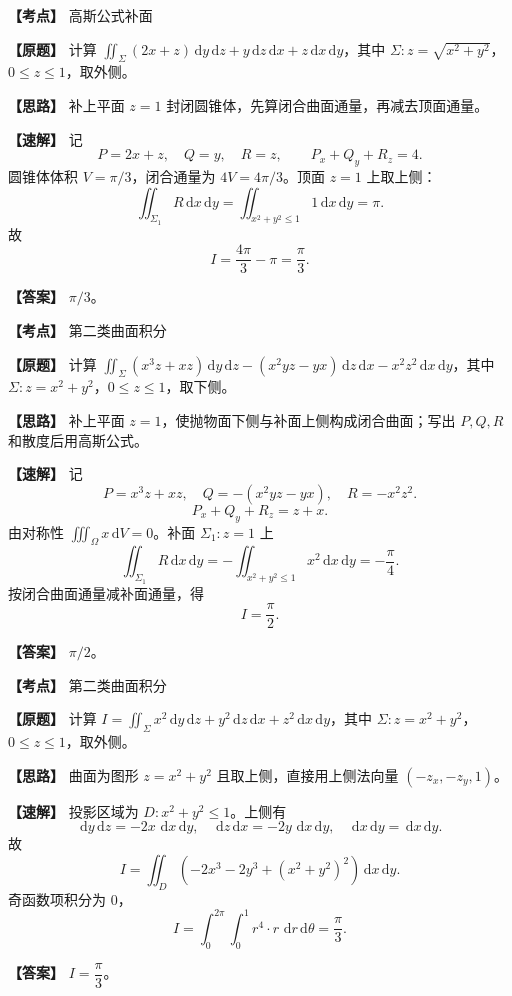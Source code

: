 ﻿\documentclass[11pt,a4paper,UTF8]{ctexart}
\newcommand{\dd}{\,\mathrm d}
\begin{document}
\newpage

\begin{answerbox}[2024--2025 七]
\textbf{【考点】} 高斯公式补面

\textbf{【原题】} 计算 $\displaystyle \iint_{\Sigma}(2x+z)\dd y\dd z+y\dd z\dd x+z\dd x\dd y$，其中 $\Sigma:z=\sqrt{x^2+y^2}$，$0\le z\le1$，取外侧。

\textbf{【思路】} 补上平面 $z=1$ 封闭圆锥体，先算闭合曲面通量，再减去顶面通量。

\textbf{【速解】} 记
\[
P=2x+z,\quad Q=y,\quad R=z,\qquad P_x+Q_y+R_z=4.
\]
圆锥体体积 $V=\pi/3$，闭合通量为 $4V=4\pi/3$。顶面 $z=1$ 上取上侧：
\[
\iint_{\Sigma_1}R\dd x\dd y=\iint_{x^2+y^2\le1}1\dd x\dd y=\pi.
\]
故
\[
I=\frac{4\pi}{3}-\pi=\frac{\pi}{3}.
\]

\textbf{【答案】} $\pi/3$。
\end{answerbox}

\begin{answerbox}[2023--2024 三-3]
\textbf{【考点】} 第二类曲面积分

\textbf{【原题】} 计算 $\displaystyle \iint_{\Sigma}(x^3z+xz)\dd y\dd z-(x^2yz-yx)\dd z\dd x-x^2z^2\dd x\dd y$，其中 $\Sigma:z=x^2+y^2$，$0\le z\le1$，取下侧。

\textbf{【思路】} 补上平面 $z=1$，使抛物面下侧与补面上侧构成闭合曲面；写出 $P,Q,R$ 和散度后用高斯公式。

\textbf{【速解】} 记
\[
P=x^3z+xz,\quad Q=-(x^2yz-yx),\quad R=-x^2z^2.
\]
\[
P_x+Q_y+R_z=z+x.
\]
由对称性 $\iiint_\Omega x\dd V=0$。补面 $\Sigma_1:z=1$ 上
\[
\iint_{\Sigma_1}R\dd x\dd y
=-\iint_{x^2+y^2\le1}x^2\dd x\dd y=-\frac{\pi}{4}.
\]
按闭合曲面通量减补面通量，得
\[
I=\frac{\pi}{2}.
\]

\textbf{【答案】} $\pi/2$。
\end{answerbox}

\begin{answerbox}[2021--2022 四-14]
\textbf{【考点】} 第二类曲面积分

\textbf{【原题】} 计算 $I=\displaystyle \iint_{\Sigma}x^2\dd y\dd z+y^2\dd z\dd x+z^2\dd x\dd y$，其中 $\Sigma:z=x^2+y^2$，$0\le z\le1$，取外侧。

\textbf{【思路】} 曲面为图形 $z=x^2+y^2$ 且取上侧，直接用上侧法向量 $(-z_x,-z_y,1)$。

\textbf{【速解】} 投影区域为 $D:x^2+y^2\le1$。上侧有
\[
\dd y\dd z=-2x\,\dd x\dd y,\quad
\dd z\dd x=-2y\,\dd x\dd y,\quad
\dd x\dd y=\dd x\dd y.
\]
故
\[
I=\iint_D(-2x^3-2y^3+(x^2+y^2)^2)\dd x\dd y.
\]
奇函数项积分为 $0$，
\[
I=\int_0^{2\pi}\int_0^1 r^4\cdot r\,\dd r\dd\theta=\frac{\pi}{3}.
\]

\textbf{【答案】} $I=\dfrac{\pi}{3}$。
\end{answerbox}
\end{document}
